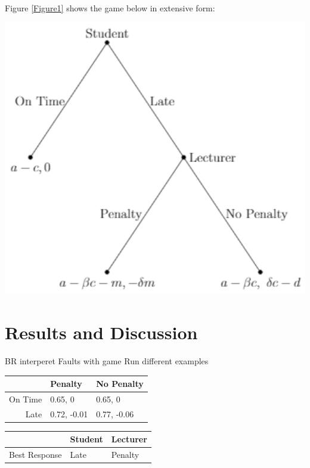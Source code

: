 \documentclass[11pt,preprint, authoryear]{elsarticle}
\let\origfigure\figure
\let\endorigfigure\endfigure
\renewenvironment{figure}[1][2] {
    \expandafter\origfigure\expandafter[H]
} {
    \endorigfigure
}
\let\origtable\table
\let\endorigtable\endtable
\renewenvironment{table}[1][2] {
    \expandafter\origtable\expandafter[H]
} {
    \endorigtable
}
\numberwithin{equation}{section}
\numberwithin{figure}{section}
\numberwithin{table}{section}
\begin{document}
Figure \ref{Figure1} shows the game below in extensive form:

\begin{figure}[H]

{\centering \includegraphics[width=14.86in]{img/tree} 

}

\caption{Game Tree \label{Figure1}}\label{fig:Figure1}
\end{figure}

\hypertarget{results-and-discussion}{%
\section{\texorpdfstring{Results and Discussion
\label{result}}{Results and Discussion }}\label{results-and-discussion}}

BR interperet Faults with game Run different examples

\begin{table}[H]
\centering
\begin{tabular}{rll}
  \toprule
 & Penalty & No Penalty \\ 
  \midrule
On Time & 0.65, 0 & 0.65, 0 \\ 
  Late & 0.72, -0.01 & 0.77, -0.06 \\ 
   \bottomrule
\end{tabular}
\caption{Simultaneous Game Best Response \label{tab2}} 
\end{table}
\begin{table}[H]
\centering
\begin{tabular}{rll}
  \toprule
 & Student & Lecturer \\ 
  \midrule
Best Response & Late & Penalty \\ 
   \bottomrule
\end{tabular}
\caption{Best Response\label{tab3}} 
\end{table}
\end{document}
